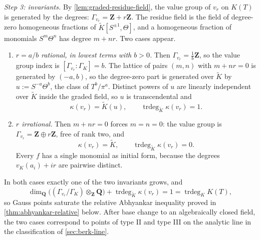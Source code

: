 \begin{example}
\emph{Step 3: invariants.} By \cref{lem:graded-residue-field}, the value
group of $v_r$ on $K(T)$ is generated by the degrees:
$\Gamma_{v_r}=\mathbf Z+r\mathbf Z$. The residue field is the field of
degree-zero homogeneous fractions of $\widetilde K[S^{\pm1},\Theta]$, and a
homogeneous fraction of monomials $S^m\Theta^n$ has degree $m+nr$. Two
cases appear.
\begin{enumerate}
\item \emph{$r=a/b$ rational, in lowest terms with $b>0$.} Then
      $\Gamma_{v_r}=\tfrac1b\mathbf Z$, so the value group index is
      $[\Gamma_{v_r}:\Gamma_K]=b$. The lattice of pairs $(m,n)$ with
      $m+nr=0$ is generated by $(-a,b)$, so the degree-zero part is
      generated over $\widetilde K$ by $u:=S^{-a}\Theta^b$, the class of
      $T^b/\pi^a$. Distinct powers of $u$ are linearly independent over
      $\widetilde K$ inside the graded field, so $u$ is transcendental
      and
      \[
       \kappa(v_r)=\widetilde K(u),
       \qquad
       \operatorname{trdeg}_{\widetilde K}\kappa(v_r)=1.
      \]
\item \emph{$r$ irrational.} Then $m+nr=0$ forces $m=n=0$: the value
      group is $\Gamma_{v_r}=\mathbf Z\oplus r\mathbf Z$, free of rank
      two, and
      \[
       \kappa(v_r)=\widetilde K,
       \qquad
       \operatorname{trdeg}_{\widetilde K}\kappa(v_r)=0.
      \]
      Every $f$ has a single monomial as initial form, because the
      degrees $v_K(a_i)+ir$ are pairwise distinct.
\end{enumerate}
In both cases exactly one of the two invariants grows, and
\[
 \dim_{\mathbf Q}
 \bigl((\Gamma_{v_r}/\Gamma_K)\otimes_{\mathbf Z}\mathbf Q\bigr)
 +\operatorname{trdeg}_{\widetilde K}\kappa(v_r)
 =1
 =\operatorname{trdeg}_KK(T),
\]
so Gauss points saturate the relative Abhyankar inequality proved in
\cref{thm:abhyankar-relative} below. After base change to an algebraically
closed field, the two cases correspond to points of type II and type III on
the analytic line in the classification of \cref{sec:berk-line}.
\end{example}

